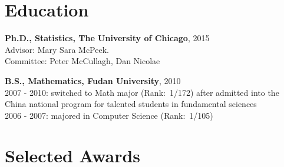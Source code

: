 \documentclass[letterpaper]{article}
\renewenvironment{itemize}{
  \begin{list}{}{
    \setlength{\leftmargin}{1.5em}
  }
}{
  \end{list}
}
\begin{document}
\section*{Education}
\begin{itemize}
\item {\bf Ph.D., Statistics, The University of Chicago}, 2015\\
Advisor: Mary Sara McPeek. \\
Committee: Peter McCullagh, Dan Nicolae 
\item {\bf B.S., Mathematics, Fudan University}, 2010\\
2007 - 2010: switched to Math major (Rank:\ 1/172) after admitted into the China national program for talented students in fundamental sciences\\
2006 - 2007: majored in Computer Science (Rank:\ 1/105)
\end{itemize}





\section*{Selected Awards}
\end{document}
